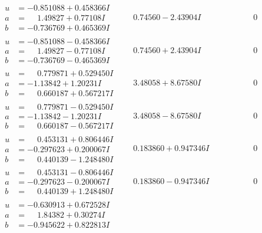 \documentclass[1p]{elsarticle_modified}
\theoremstyle{definition}
\begin{document}
$$\begin{array}{c|c|c}
\begin{aligned}
u &= -0.851088 + 0.458366 I \\
a &= \phantom{-}1.49827 + 0.77108 I \\
b &= -0.736769 + 0.465369 I\end{aligned}
 & \phantom{-}0.74560 - 2.43904 I & \phantom{-0.000000 } 0 \\ \hline\begin{aligned}
u &= -0.851088 - 0.458366 I \\
a &= \phantom{-}1.49827 - 0.77108 I \\
b &= -0.736769 - 0.465369 I\end{aligned}
 & \phantom{-}0.74560 + 2.43904 I & \phantom{-0.000000 } 0 \\ \hline\begin{aligned}
u &= \phantom{-}0.779871 + 0.529450 I \\
a &= -1.13842 + 1.20231 I \\
b &= \phantom{-}0.660187 + 0.567217 I\end{aligned}
 & \phantom{-}3.48058 + 8.67580 I & \phantom{-0.000000 } 0 \\ \hline\begin{aligned}
u &= \phantom{-}0.779871 - 0.529450 I \\
a &= -1.13842 - 1.20231 I \\
b &= \phantom{-}0.660187 - 0.567217 I\end{aligned}
 & \phantom{-}3.48058 - 8.67580 I & \phantom{-0.000000 } 0 \\ \hline\begin{aligned}
u &= \phantom{-}0.453131 + 0.806446 I \\
a &= -0.297623 + 0.200067 I \\
b &= \phantom{-}0.440139 - 1.248480 I\end{aligned}
 & \phantom{-}0.183860 + 0.947346 I & \phantom{-0.000000 } 0 \\ \hline\begin{aligned}
u &= \phantom{-}0.453131 - 0.806446 I \\
a &= -0.297623 - 0.200067 I \\
b &= \phantom{-}0.440139 + 1.248480 I\end{aligned}
 & \phantom{-}0.183860 - 0.947346 I & \phantom{-0.000000 } 0 \\ \hline\begin{aligned}
u &= -0.630913 + 0.672528 I \\
a &= \phantom{-}1.84382 + 0.30274 I \\
b &= -0.945622 + 0.822813 I\end{aligned}

\end{array}$$
\end{document}
